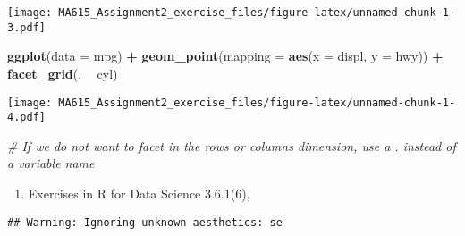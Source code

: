 \documentclass[]{article}
\newenvironment{Shaded}{\begin{snugshade}}{\end{snugshade}}
\newcommand{\KeywordTok}[1]{\textcolor[rgb]{0.13,0.29,0.53}{\textbf{#1}}}
\newcommand{\DataTypeTok}[1]{\textcolor[rgb]{0.13,0.29,0.53}{#1}}
\newcommand{\StringTok}[1]{\textcolor[rgb]{0.31,0.60,0.02}{#1}}
\newcommand{\CommentTok}[1]{\textcolor[rgb]{0.56,0.35,0.01}{\textit{#1}}}
\newcommand{\OtherTok}[1]{\textcolor[rgb]{0.56,0.35,0.01}{#1}}
\newcommand{\OperatorTok}[1]{\textcolor[rgb]{0.81,0.36,0.00}{\textbf{#1}}}
\newcommand{\NormalTok}[1]{#1}
\providecommand{\tightlist}{%
  \setlength{\itemsep}{0pt}\setlength{\parskip}{0pt}}
\begin{document}
\texttt{[image: MA615\_Assignment2\_exercise\_files/figure-latex/unnamed-chunk-1-3.pdf]}

\begin{Shaded}
\begin{Highlighting}[]
\KeywordTok{ggplot}\NormalTok{(}\DataTypeTok{data =}\NormalTok{ mpg) }\OperatorTok{+}\StringTok{ }
\StringTok{  }\KeywordTok{geom_point}\NormalTok{(}\DataTypeTok{mapping =} \KeywordTok{aes}\NormalTok{(}\DataTypeTok{x =}\NormalTok{ displ, }\DataTypeTok{y =}\NormalTok{ hwy)) }\OperatorTok{+}
\StringTok{  }\KeywordTok{facet_grid}\NormalTok{(. }\OperatorTok{~}\StringTok{ }\NormalTok{cyl)}
\end{Highlighting}
\end{Shaded}

\texttt{[image: MA615\_Assignment2\_exercise\_files/figure-latex/unnamed-chunk-1-4.pdf]}

\begin{Shaded}
\begin{Highlighting}[]
\CommentTok{# If we do not want to facet in the rows or columns dimension, use a . instead of a variable name}
\end{Highlighting}
\end{Shaded}

\begin{enumerate}
\def\labelenumi{\arabic{enumi}.}
\setcounter{enumi}{1}
\tightlist
\item
  Exercises in R for Data Science 3.6.1(6),
\end{enumerate}

\begin{Shaded}
\end{Shaded}

\begin{verbatim}
## Warning: Ignoring unknown aesthetics: se
\end{verbatim}
\end{document}
